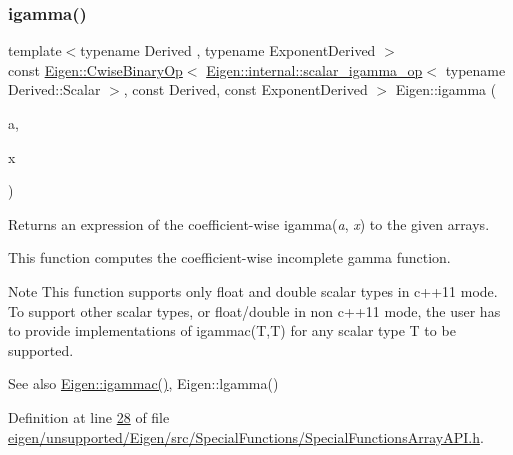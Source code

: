 \subsubsection{\texorpdfstring{igamma()}{igamma()}}
{\footnotesize\ttfamily template$<$typename Derived , typename Exponent\+Derived $>$ \\
const \hyperlink{group___core___module_class_eigen_1_1_cwise_binary_op}{Eigen\+::\+Cwise\+Binary\+Op}$<$ \hyperlink{struct_eigen_1_1internal_1_1scalar__igamma__op}{Eigen\+::internal\+::scalar\+\_\+igamma\+\_\+op}$<$ typename Derived\+::\+Scalar $>$, const Derived, const Exponent\+Derived $>$ Eigen\+::igamma (\begin{DoxyParamCaption}\item[{const \hyperlink{group___core___module_class_eigen_1_1_array_base}{Eigen\+::\+Array\+Base}$<$ Derived $>$ \&}]{a,  }\item[{const \hyperlink{group___core___module_class_eigen_1_1_array_base}{Eigen\+::\+Array\+Base}$<$ Exponent\+Derived $>$ \&}]{x }\end{DoxyParamCaption})\hspace{0.3cm}{\ttfamily [inline]}}

\begin{DoxyReturn}{Returns}
an expression of the coefficient-\/wise igamma({\itshape a}, {\itshape x}) to the given arrays.
\end{DoxyReturn}
This function computes the coefficient-\/wise incomplete gamma function.

\begin{DoxyNote}{Note}
This function supports only float and double scalar types in c++11 mode. To support other scalar types, or float/double in non c++11 mode, the user has to provide implementations of igammac(\+T,\+T) for any scalar type T to be supported.
\end{DoxyNote}
\begin{DoxySeeAlso}{See also}
\hyperlink{namespace_eigen_a1abaa2ff8c7b1871eaf026a47c6bbf3b}{Eigen\+::igammac()}, Eigen\+::lgamma() 
\end{DoxySeeAlso}


Definition at line \hyperlink{eigen_2unsupported_2_eigen_2src_2_special_functions_2_special_functions_array_a_p_i_8h_source_l00028}{28} of file \hyperlink{eigen_2unsupported_2_eigen_2src_2_special_functions_2_special_functions_array_a_p_i_8h_source}{eigen/unsupported/\+Eigen/src/\+Special\+Functions/\+Special\+Functions\+Array\+A\+P\+I.\+h}.

\mbox{\label{namespace_eigen_a1abaa2ff8c7b1871eaf026a47c6bbf3b}} 
